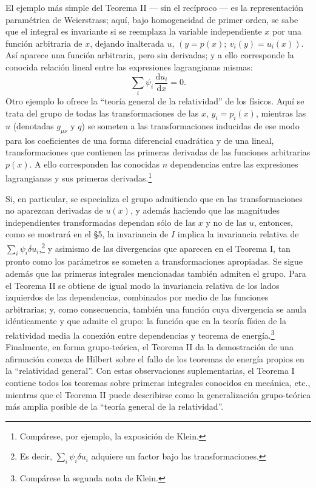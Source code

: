 \documentclass[11pt]{article}
\providecommand{\dd}{\mathrm d}
\begin{document}
El ejemplo más simple del Teorema II --- sin el recíproco --- es la representación paramétrica de Weierstrass; aquí, bajo homogeneidad de primer orden, se sabe que el integral es invariante si se reemplaza la variable independiente \(x\) por una función arbitraria de \(x\), dejando inalterada \(u\), \((y=p(x);\ v_i(y)=u_i(x))\). Así aparece una función arbitraria, pero sin derivadas; y a ello corresponde la conocida relación lineal entre las expresiones lagrangianas mismas:
\[
\sum_i \psi_i\,\frac{\dd u_i}{\dd x}=0.
\]
Otro ejemplo lo ofrece la ``teoría general de la relatividad'' de los físicos. Aquí se trata del grupo de todas las transformaciones de las \(x\), \(y_i=p_i(x)\), mientras las \(u\) (denotadas \(g_{\mu\nu}\) y \(q\)) se someten a las transformaciones inducidas de ese modo para los coeficientes de una forma diferencial cuadrática y de una lineal, transformaciones que contienen las primeras derivadas de las funciones arbitrarias \(p(x)\). A ello corresponden las conocidas \(n\) dependencias entre las expresiones lagrangianas y sus primeras derivadas.\footnote{Compárese, por ejemplo, la exposición de Klein.}

Si, en particular, se especializa el grupo admitiendo que en las transformaciones no aparezcan derivadas de \(u(x)\), y además haciendo que las magnitudes independientes transformadas dependan sólo de las \(x\) y no de las \(u\), entonces, como se mostrará en el \S{}5, la invariancia de \(I\) implica la invariancia relativa de \(\sum_i\psi_i\delta u_i\),\footnote{Es decir, \(\sum_i\psi_i\delta u_i\) adquiere un factor bajo las transformaciones.} y asimismo de las divergencias que aparecen en el Teorema I, tan pronto como los parámetros se someten a transformaciones apropiadas. Se sigue además que las primeras integrales mencionadas también admiten el grupo. Para el Teorema II se obtiene de igual modo la invariancia relativa de los lados izquierdos de las dependencias, combinados por medio de las funciones arbitrarias; y, como consecuencia, también una función cuya divergencia se anula idénticamente y que admite el grupo: la función que en la teoría física de la relatividad media la conexión entre dependencias y teorema de energía.\footnote{Compárese la segunda nota de Klein.} Finalmente, en forma grupo-teórica, el Teorema II da la demostración de una afirmación conexa de Hilbert sobre el fallo de los teoremas de energía propios en la ``relatividad general''. Con estas observaciones suplementarias, el Teorema I contiene todos los teoremas sobre primeras integrales conocidos en mecánica, etc., mientras que el Teorema II puede describirse como la generalización grupo-teórica más amplia posible de la ``teoría general de la relatividad''.
\end{document}
